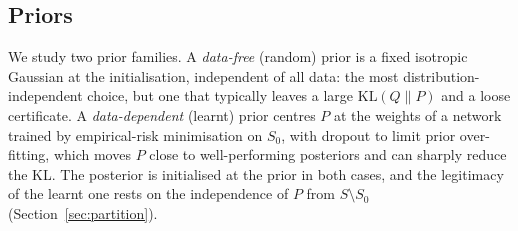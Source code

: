 \subsection{Priors}\label{sec:priors}

We study two prior families. A \emph{data-free} (random) prior is a fixed
isotropic Gaussian at the initialisation, independent of all data: the most
distribution-independent choice, but one that typically leaves a large
$\mathrm{KL}(Q\|P)$ and a loose certificate. A \emph{data-dependent} (learnt)
prior centres $P$ at the weights of a network trained by empirical-risk
minimisation on $S_0$, with dropout to limit prior over-fitting, which moves $P$
close to well-performing posteriors and can sharply reduce the KL. The posterior
is initialised at the prior in both cases, and the legitimacy of the learnt one
rests on the independence of $P$ from $S\setminus S_0$
(Section~\ref{sec:partition}).
